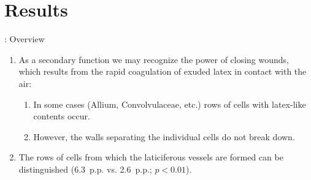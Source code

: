 \section{Results}


\begin{frame}{\titleprefix: Overview}

	\begin{enumerate}
		\item<1-> As a secondary function we may recognize the power of closing wounds, which results from the rapid coagulation of exuded latex in contact with the air:
		\begin{enumerate}
			\item<2-> In some cases (Allium, Convolvulaceae, etc.) rows of cells with latex-like contents occur.
			\item<2-> However, the walls separating the individual cells do not break down.
		\end{enumerate}
		\item<3-> The rows of cells from which the laticiferous vessels are formed can be distinguished (6.3~p.p. vs. 2.6~p.p.; ${p < 0.01}$).
	\end{enumerate}

\end{frame}


